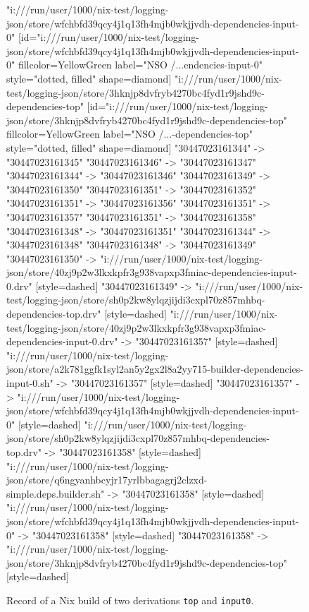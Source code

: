 \begin{figure}[p]
\begin{sideways}
{"i:///run/user/1000/nix-test/logging-json/store/wfchbfd39qcy4j1q13fh4mjb0wkjjvdh-dependencies-input-0" [id="i:///run/user/1000/nix-test/logging-json/store/wfchbfd39qcy4j1q13fh4mjb0wkjjvdh-dependencies-input-0" fillcolor=YellowGreen label="NSO /...endencies-input-0" style="dotted, filled" shape=diamond]
"i:///run/user/1000/nix-test/logging-json/store/3hknjp8dvfryb4270bc4fyd1r9jshd9c-dependencies-top" [id="i:///run/user/1000/nix-test/logging-json/store/3hknjp8dvfryb4270bc4fyd1r9jshd9c-dependencies-top" fillcolor=YellowGreen label="NSO /...-dependencies-top" style="dotted, filled" shape=diamond]
"30447023161344" -> "30447023161345"
"30447023161346" -> "30447023161347"
"30447023161344" -> "30447023161346"
"30447023161349" -> "30447023161350"
"30447023161351" -> "30447023161352"
"30447023161351" -> "30447023161356"
"30447023161351" -> "30447023161357"
"30447023161351" -> "30447023161358"
"30447023161348" -> "30447023161351"
"30447023161344" -> "30447023161348"
"30447023161348" -> "30447023161349"
"30447023161350" -> "i:///run/user/1000/nix-test/logging-json/store/40zj9p2w3lkxkpfr3g938vapxp3fmiac-dependencies-input-0.drv" [style=dashed]
"30447023161349" -> "i:///run/user/1000/nix-test/logging-json/store/sh0p2kw8ylqzjijdi3cxpl70z857mhbq-dependencies-top.drv" [style=dashed]
"i:///run/user/1000/nix-test/logging-json/store/40zj9p2w3lkxkpfr3g938vapxp3fmiac-dependencies-input-0.drv" -> "30447023161357" [style=dashed]
"i:///run/user/1000/nix-test/logging-json/store/a2k781ggfk1syl2an5y2gx2l8a2yy715-builder-dependencies-input-0.sh" -> "30447023161357" [style=dashed]
"30447023161357" -> "i:///run/user/1000/nix-test/logging-json/store/wfchbfd39qcy4j1q13fh4mjb0wkjjvdh-dependencies-input-0" [style=dashed]
"i:///run/user/1000/nix-test/logging-json/store/sh0p2kw8ylqzjijdi3cxpl70z857mhbq-dependencies-top.drv" -> "30447023161358" [style=dashed]
"i:///run/user/1000/nix-test/logging-json/store/q6ngyanhbcyjr17yrlbbagagrj2clzxd-simple.deps.builder.sh" -> "30447023161358" [style=dashed]
"i:///run/user/1000/nix-test/logging-json/store/wfchbfd39qcy4j1q13fh4mjb0wkjjvdh-dependencies-input-0" -> "30447023161358" [style=dashed]
"30447023161358" -> "i:///run/user/1000/nix-test/logging-json/store/3hknjp8dvfryb4270bc4fyd1r9jshd9c-dependencies-top" [style=dashed]


}
\end{sideways}
    \vspace{-2em}
    \caption{Record of a Nix build of two derivations \texttt{top} and \texttt{input0}.} 
    \label{fig:nix-simple-deps-build}
\end{figure}

